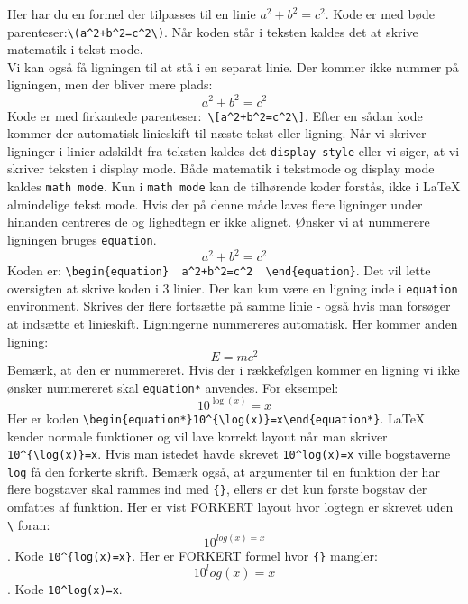 \documentclass{article}
\begin{document}
Her har du en formel der tilpasses til en linie \(a^2+b^2=c^2\). Kode er med bøde parenteser:\verb"\(a^2+b^2=c^2\)". Når koden står i teksten kaldes det at skrive matematik i tekst mode.\\
Vi kan også få ligningen til at stå i en separat linie. Der kommer ikke nummer på ligningen, men der bliver mere plads: \[a^2+b^2=c^2\] 
Kode er med firkantede parenteser:\verb" \[a^2+b^2=c^2\]". Efter en sådan kode kommer der automatisk linieskift til næste tekst eller ligning. Når vi skriver ligninger i linier adskildt fra teksten kaldes det \verb"display style" eller vi siger, at vi skriver teksten i display mode. Både matematik i tekstmode og display mode kaldes \verb"math mode". Kun i \verb"math mode" kan de tilhørende koder forstås, ikke i \LaTeX{} almindelige tekst mode.
Hvis der på denne måde laves flere ligninger under hinanden centreres de og lighedtegn er ikke alignet.
Ønsker vi at nummerere ligningen bruges \verb"equation". 
\begin{equation}
a^2+b^2=c^2
\end{equation}
Koden er: \verb"\begin{equation}  a^2+b^2=c^2  \end{equation}". Det vil lette oversigten at skrive koden i 3 linier.
Der kan kun være en ligning inde i \verb"equation" environment. Skrives der flere fortsætte på samme linie - også hvis man forsøger at indsætte et linieskift.
Ligningerne nummereres automatisk. Her kommer anden ligning:
\begin{equation}
E=mc^2
\end{equation}
Bemærk, at den er nummereret. Hvis der i rækkefølgen kommer en ligning vi ikke ønsker nummereret skal \verb"equation*" anvendes. For eksempel:
\begin{equation*}
10^{\log(x)}=x
\end{equation*}
Her er koden \verb"\begin{equation*}10^{\log(x)}=x\end{equation*}".
\LaTeX{} kender normale funktioner og vil lave korrekt layout når man skriver \verb"10^{\log(x)}=x". Hvis man istedet havde skrevet \verb"10^log(x)=x" ville bogstaverne \verb"log" få den forkerte skrift.  Bemærk også, at argumenter til en funktion der har flere bogstaver skal rammes ind med \verb"{}", ellers er det kun første bogstav der omfattes af funktion. Her er vist FORKERT layout hvor logtegn er skrevet uden \verb"\" foran: \[10^{log(x)=x}\]. Kode \verb"10^{log(x)=x}".
Her er FORKERT formel hvor \verb"{}" mangler: \[10^log(x)=x\]. Kode \verb"10^log(x)=x".
\end{document}
